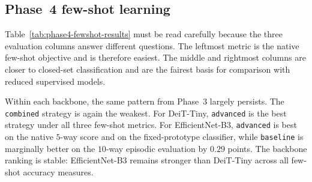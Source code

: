 \documentclass[12pt,a4paper]{article}
\begin{document}
\subsection{Phase~4 few-shot learning}
\label{subsec:phase4-fewshot-results}

\begin{table}[t!]
\centering
\caption{Phase~4 few-shot results on the class-balanced $10\%$ subset (mean $\pm$ standard deviation over three seeds, all values in \%)}
\label{tab:phase4-fewshot-results}
\smallskip
\footnotesize
{}
\end{table}

Table~\ref{tab:phase4-fewshot-results} must be read carefully because the three evaluation columns answer different questions. The leftmost metric is the native few-shot objective and is therefore easiest. The middle and rightmost columns are closer to closed-set classification and are the fairest basis for comparison with reduced supervised models.

Within each backbone, the same pattern from Phase~3 largely persists. The \texttt{combined} strategy is again the weakest. For DeiT-Tiny, \texttt{advanced} is the best strategy under all three few-shot metrics. For EfficientNet-B3, \texttt{advanced} is best on the native $5$-way score and on the fixed-prototype classifier, while \texttt{baseline} is marginally better on the $10$-way episodic evaluation by $0.29$ points. The backbone ranking is stable: EfficientNet-B3 remains stronger than DeiT-Tiny across all few-shot accuracy measures.
\end{document}
